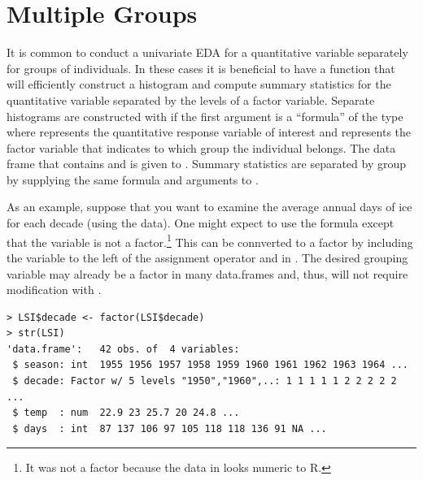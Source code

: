 \documentclass[10pt,openany]{book}\usepackage[]{graphicx}\usepackage[]{color}
\makeatletter
\newenvironment{kframe}{%
 \def\at@end@of@kframe{}%
 \ifinner\ifhmode%
  \def\at@end@of@kframe{\end{minipage}}%
  \begin{minipage}{\columnwidth}%
 \fi\fi%
 \def\FrameCommand##1{\hskip\@totalleftmargin \hskip-\fboxsep
 \colorbox{shadecolor}{##1}\hskip-\fboxsep
     \hskip-\linewidth \hskip-\@totalleftmargin \hskip\columnwidth}%
 \MakeFramed {\advance\hsize-\width
   \@totalleftmargin\z@ \linewidth\hsize
   \@setminipage}}%
 {\par\unskip\endMakeFramed%
 \at@end@of@kframe}
\newenvironment{knitrout}{}{} %
\makeatother
\begin{document}
\section{Multiple Groups} \label{sect:MultGroups}
It is common to conduct a univariate EDA for a quantitative variable separately for groups of individuals.  In these cases it is beneficial to have a function that will efficiently construct a histogram and compute summary statistics for the quantitative variable separated by the levels of a factor variable.  Separate histograms are constructed with  if the first argument is a ``formula'' of the type  where  represents the quantitative response variable of interest and  represents the factor variable that indicates to which group the individual belongs.  The data frame that contains  and  is given to .  Summary statistics are separated by group by supplying the same formula and  arguments to .

As an example, suppose that you want to examine the average annual days of ice for each decade (using the  data).  One might expect to use the  formula except that the  variable is not a factor.\footnote{It was not a factor because the data in  looks numeric to R.}  This can be connverted to a factor by including the variable to the left of the assignment operator and in . The desired grouping variable may already be a factor in many data.frames and, thus, will not require modification with .
\begin{knitrout}
\color{fgcolor}\begin{kframe}
\begin{verbatim}
> LSI$decade <- factor(LSI$decade)
> str(LSI)
'data.frame':	42 obs. of  4 variables:
 $ season: int  1955 1956 1957 1958 1959 1960 1961 1962 1963 1964 ...
 $ decade: Factor w/ 5 levels "1950","1960",..: 1 1 1 1 1 2 2 2 2 2 ...
 $ temp  : num  22.9 23 25.7 20 24.8 ...
 $ days  : int  87 137 106 97 105 118 118 136 91 NA ...
\end{verbatim}
\end{kframe}
\end{knitrout}
\end{document}
